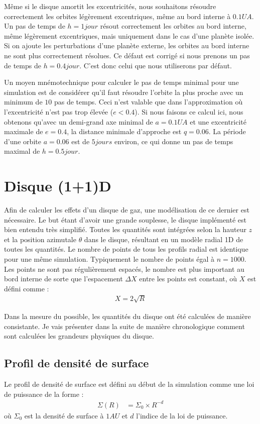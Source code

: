 Même si le disque amortit les excentricités, nous souhaitons résoudre correctement les orbites légèrement excentriques, même au bord interne à $0.1\unit{UA}$. Un pas de temps de $h=1\unit{jour}$ résout correctement les orbites au bord interne, même légèrement excentriques, mais uniquement dans le cas d'une planète isolée. Si on ajoute les perturbations d'une planète externe, les orbites au bord interne ne sont plus correctement résolues. Ce défaut est corrigé si nous prenons un pas de temps de $h=0.4\unit{jour}$. C'est donc celui que nous utiliserons par défaut.

Un moyen mnémotechnique pour calculer le pas de temps minimal pour une simulation est de considérer qu'il faut résoudre l'orbite la plus proche avec un minimum de $10$ pas de temps. Ceci n'est valable que dans l'approximation où l'excentricité n'est pas trop élevée ($e<0.4$). Si nous faisons ce calcul ici, nous obtenons qu'avec un demi-grand axe minimal de $a=0.1\unit{UA}$ et une excentricité maximale de $e=0.4$, la distance minimale d'approche est $q=0.06$. La période d'une orbite $a=0.06$ est de $5\unit{jours}$ environ, ce qui donne un pas de temps maximal de $h=0.5\unit{jour}$. 

\section{Disque (1+1)D}
Afin de calculer les effets d'un disque de gaz, une modélisation de ce dernier est nécessaire. Le but étant d'avoir une grande souplesse, le disque implémenté est bien entendu très simplifié. Toutes les quantités sont intégrées selon la hauteur $z$ et la position azimutale $\theta$ dans le disque, résultant en un modèle radial 1D de toutes les quantités. Le nombre de points de tous les profils radial est identique pour une même simulation. Typiquement le nombre de points égal à $n=1000$. Les points ne sont pas régulièrement espacés, le nombre est plus important au bord interne de sorte que l'espacement $\Delta X$ entre les points est constant, où $X$ est défini comme : 
\begin{align}
X = 2\sqrt{R}
\end{align}

Dans la mesure du possible, les quantités du disque ont été calculées de manière consistante. Je vais présenter dans la suite de manière chronologique comment sont calculées les grandeurs physiques du disque.

\subsection{Profil de densité de surface}
Le profil de densité de surface est défini au début de la simulation comme une loi de puissance de la forme :
\begin{align}
\Sigma(R) &= \Sigma_0 \times R^{-d}
\end{align}
où $\Sigma_0$ est la densité de surface à $1\unit{AU}$ et $d$ l'indice de la loi de puissance. 

